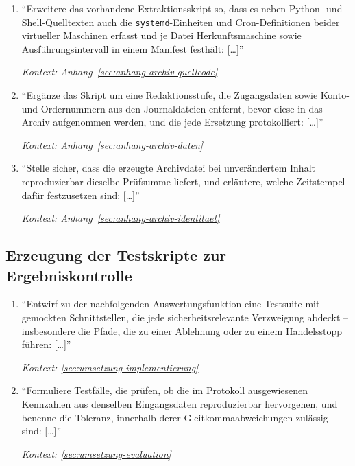\begin{enumerate}
    \item \enquote{Erweitere das vorhandene Extraktionsskript so, dass es
            neben Python- und Shell-Quelltexten auch die
            \texttt{systemd}-Einheiten und Cron-Definitionen beider
            virtueller Maschinen erfasst und je Datei Herkunftsmaschine sowie
            Ausführungsintervall in einem Manifest festhält: [\dots]}
            \par\hfill\textit{Kontext:
            Anhang~\ref{sec:anhang-archiv-quellcode}}

    \item \enquote{Ergänze das Skript um eine Redaktionsstufe, die
            Zugangsdaten sowie Konto- und Ordernummern aus den Journaldateien
            entfernt, bevor diese in das Archiv aufgenommen werden, und die
            jede Ersetzung protokolliert: [\dots]}
            \par\hfill\textit{Kontext: Anhang~\ref{sec:anhang-archiv-daten}}

    \item \enquote{Stelle sicher, dass die erzeugte Archivdatei bei
            unverändertem Inhalt reproduzierbar dieselbe Prüfsumme liefert,
            und erläutere, welche Zeitstempel dafür festzusetzen sind:
            [\dots]}
            \par\hfill\textit{Kontext:
            Anhang~\ref{sec:anhang-archiv-identitaet}}
\end{enumerate}

\subsection{Erzeugung der Testskripte zur Ergebniskontrolle}
\label{sec:prompts-claude-tests}
\begin{enumerate}
    \item \enquote{Entwirf zu der nachfolgenden Auswertungsfunktion eine
            Testsuite mit gemockten Schnittstellen, die jede
            sicherheitsrelevante Verzweigung abdeckt -- insbesondere die
            Pfade, die zu einer Ablehnung oder zu einem Handelsstopp führen:
            [\dots]}
            \par\hfill\textit{Kontext: \cref{sec:umsetzung-implementierung}}

    \item \enquote{Formuliere Testfälle, die prüfen, ob die im Protokoll
            ausgewiesenen Kennzahlen aus denselben Eingangsdaten
            reproduzierbar hervorgehen, und benenne die Toleranz, innerhalb
            derer Gleitkommaabweichungen zulässig sind: [\dots]}
            \par\hfill\textit{Kontext: \cref{sec:umsetzung-evaluation}}
\end{enumerate}

